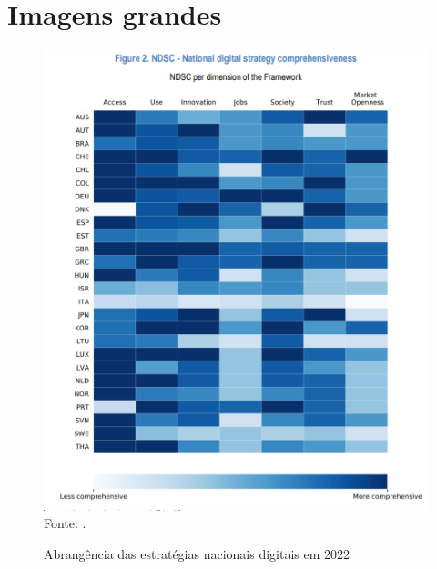 \chapter{Imagens grandes}
\label{imagens_grandes}

\begin{figure}[H]
	\centering
	\caption{Abrangência das estratégias nacionais digitais em 2022}
	\includegraphics[width=0.8\linewidth]{figuras/nds_comprehensiveness_2022}
	\label{fig:nds_comprehensiveness_2022}
	\\ \footnotesize{Fonte: \cite{going_digital_2022}.}
\end{figure}